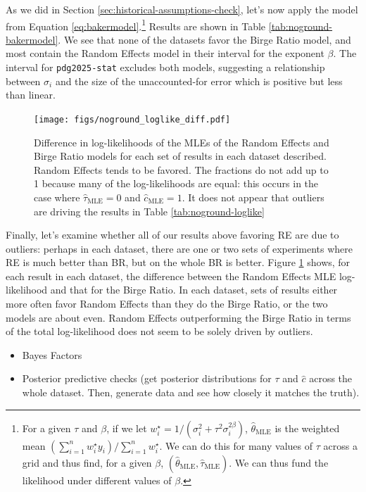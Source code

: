 \documentclass[letterpaper,12pt]{article}
\begin{document}
As we did in Section \ref{sec:historical-assumptions-check}, let's now apply the model from Equation \ref{eq:bakermodel}.\footnote{For a given $\tau$ and $\beta$, if we let $w_i^\star=1/\left(\sigma_i^2+\tau^2\sigma_i^{2\beta}\right)$, $\hat\theta_{\mathrm{MLE}}$ is the weighted mean $(\sum_{i=1}^nw_i^\star y_i)/\sum_{i=1}^nw_i^\star$. We can do this for many values of $\tau$ across a grid and thus find, for a given $\beta$, $(\hat\theta_{\mathrm{MLE}},\hat\tau_{\mathrm{MLE}})$. We can thus fund the likelihood under different values of $\beta$.} Results are shown in Table \ref{tab:noground-bakermodel}. We see that none of the datasets favor the Birge Ratio model, and most contain the Random Effects model in their interval for the exponent $\beta$. The interval for \texttt{pdg2025-stat} excludes both models, suggesting a relationship between $\sigma_i$ and the size of the unaccounted-for error which is positive but less than linear.

\begin{figure}[htbp]
  \centering
  \texttt{[image: figs/noground\_loglike\_diff.pdf]}
  \caption{Difference in log-likelihoods of the MLEs of the Random Effects and Birge Ratio models for each set of results in each dataset described. Random Effects tends to be favored. The fractions do not add up to 1 because many of the log-likelihoods are equal: this occurs in the case where $\hat\tau_{\mathrm{MLE}}=0$ and $\hat{c}_{\mathrm{MLE}}=1$. It does not appear that outliers are driving the results in Table \ref{tab:noground-loglike}}
  \label{fig:noground-loglike}
\end{figure}

Finally, let's examine whether all of our results above favoring RE are due to outliers: perhaps in each dataset, there are one or two sets of experiments where RE is much better than BR, but on the whole BR is better. Figure \ref{fig:noground-loglike} shows, for each result in each dataset, the difference between the Random Effects MLE log-likelihood and that for the Birge Ratio. In each dataset, sets of results either more often favor Random Effects than they do the Birge Ratio, or the two models are about even. Random Effects outperforming the Birge Ratio in terms of the total log-likelihood does not seem to be solely driven by outliers.



\begin{itemize}

\item
  Bayes Factors
\item
  Posterior predictive checks (get posterior distributions for $\tau$ and $\hat{c}$ across the whole dataset. Then, generate data and see how closely it matches the truth).
\end{itemize}
\end{document}

